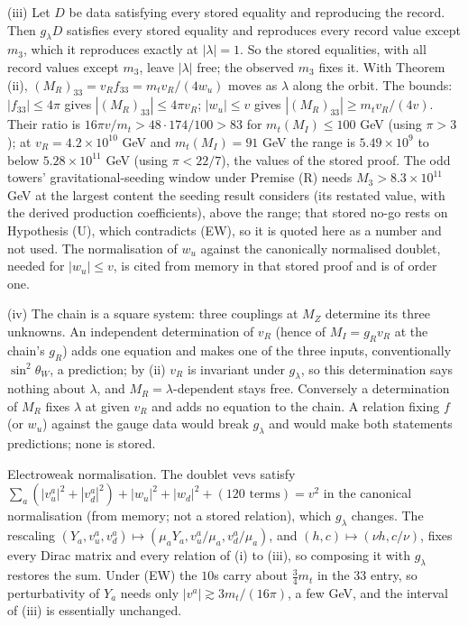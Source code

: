 (iii) Let $D$ be data satisfying every stored equality and reproducing the record. Then $g_{\lambda}D$ satisfies every stored equality and reproduces every record value except $m_{3}$, which it reproduces exactly at $|\lambda| = 1$. So the stored equalities, with all record values except $m_{3}$, leave $|\lambda|$ free; the observed $m_{3}$ fixes it. With Theorem (ii), $(M_{R})_{33} = v_{R}f_{33} = m_{t}v_{R}/(4w_{u})$ moves as $\lambda$ along the orbit. The bounds: $|f_{33}| \le 4\pi$ gives $|(M_{R})_{33}| \le 4\pi v_{R}$; $|w_{u}| \le v$ gives $|(M_{R})_{33}| \ge m_{t}v_{R}/(4v)$. Their ratio is $16\pi v/m_{t} > 48 \cdot 174/100 > 83$ for $m_{t}(M_{I}) \le 100$ GeV (using $\pi > 3$); at $v_{R} = 4.2 \times 10^{10}$ GeV and $m_{t}(M_{I}) = 91$ GeV the range is $5.49 \times 10^{9}$ to below $5.28 \times 10^{11}$ GeV (using $\pi < 22/7$), the values of the stored proof. The odd towers' gravitational-seeding window under Premise (R) needs $M_{3} > 8.3 \times 10^{11}$ GeV at the largest content the seeding result considers (its restated value, with the derived production coefficients), above the range; that stored no-go rests on Hypothesis (U), which contradicts (EW), so it is quoted here as a number and not used. The normalisation of $w_{u}$ against the canonically normalised doublet, needed for $|w_{u}| \le v$, is cited from memory in that stored proof and is of order one.

(iv) The chain is a square system: three couplings at $M_{Z}$ determine its three unknowns. An independent determination of $v_{R}$ (hence of $M_{I} = g_{R}v_{R}$ at the chain's $g_{R}$) adds one equation and makes one of the three inputs, conventionally $\sin^{2}\theta_{W}$, a prediction; by (ii) $v_{R}$ is invariant under $g_{\lambda}$, so this determination says nothing about $\lambda$, and $M_{R} = \lambda$-dependent stays free. Conversely a determination of $M_{R}$ fixes $\lambda$ at given $v_{R}$ and adds no equation to the chain. A relation fixing $f$ (or $w_{u}$) against the gauge data would break $g_{\lambda}$ and would make both statements predictions; none is stored.

Electroweak normalisation. The doublet vevs satisfy $\sum_{a}(|v_{u}^{a}|^{2} + |v_{d}^{a}|^{2}) + |w_{u}|^{2} + |w_{d}|^{2} + (\text{$120$ terms}) = v^{2}$ in the canonical normalisation (from memory; not a stored relation), which $g_{\lambda}$ changes. The rescaling $(Y_{a}, v^{a}_{u}, v^{a}_{d}) \mapsto (\mu_{a}Y_{a}, v^{a}_{u}/\mu_{a}, v^{a}_{d}/\mu_{a})$, and $(h, c) \mapsto (\nu h, c/\nu)$, fixes every Dirac matrix and every relation of (i) to (iii), so composing it with $g_{\lambda}$ restores the sum. Under (EW) the $10$s carry about $\tfrac34 m_{t}$ in the $33$ entry, so perturbativity of $Y_{a}$ needs only $|v^{a}| \gtrsim 3m_{t}/(16\pi)$, a few GeV, and the interval of (iii) is essentially unchanged.


